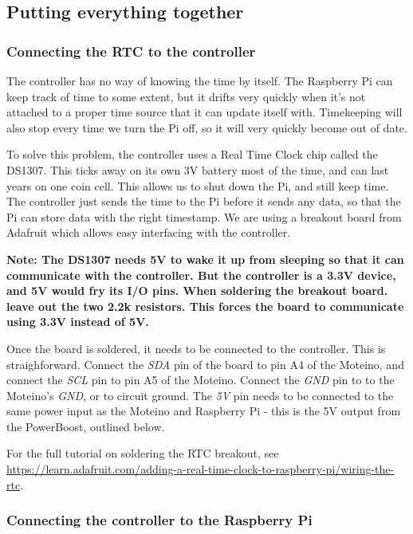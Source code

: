 \documentclass[10pt]{article}
\begin{document}
\subsection{Putting everything together}

\subsubsection{Connecting the RTC to the controller}
The controller has no way of knowing the time by itself. The Raspberry Pi can keep track of time to some extent, but it drifts very quickly when it's not attached to a proper time source that it can update itself with. Timekeeping will also stop every time we turn the Pi off, so it will very quickly become out of date.

To solve this problem, the controller uses a Real Time Clock chip called the DS1307. This ticks away on its own 3V battery most of the time, and can last years on one coin cell. This allows us to shut down the Pi, and still keep time. The controller just sends the time to the Pi before it sends any data, so that the Pi can store data with the right timestamp. We are using a breakout board from Adafruit which allows easy interfacing with the controller. \newline

\textbf{Note: The DS1307 needs 5V to wake it up from sleeping so that it can communicate with the controller. But the controller is a 3.3V device, and 5V would fry its I/O pins. When soldering the breakout board. leave out the two 2.2k resistors. This forces the board to communicate using 3.3V instead of 5V.} \newline

Once the board is soldered, it needs to be connected to the controller. This is straighforward. Connect the \textit{SDA} pin of the board to pin A4 of the Moteino, and connect the \textit{SCL} pin to pin A5 of the Moteino. Connect the \textit{GND} pin to to the Moteino's \textit{GND}, or to circuit ground. The \textit{5V} pin needs to be connected to the same power input as the Moteino and Raspberry Pi - this is the 5V output from the PowerBoost, outlined below.

For the full tutorial on soldering the RTC breakout, see \url{https://learn.adafruit.com/adding-a-real-time-clock-to-raspberry-pi/wiring-the-rtc}.

\subsubsection{Connecting the controller to the Raspberry Pi}
\end{document}
